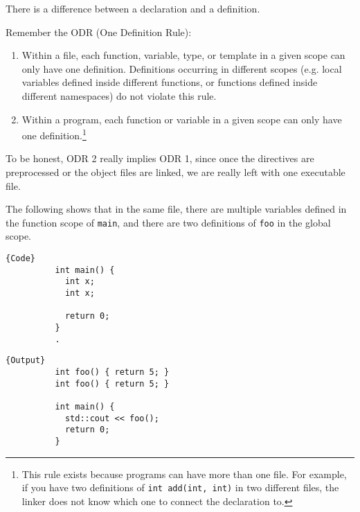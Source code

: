 \documentclass{article}
\begin{document}
    There is a difference between a declaration and a definition. 

    \begin{definition}[ODR]
      Remember the ODR (One Definition Rule): 
      \begin{enumerate}
        \item Within a file, each function, variable, type, or template in a given scope can only have one definition. Definitions occurring in different scopes (e.g. local variables defined inside different functions, or functions defined inside different namespaces) do not violate this rule. 

        \item Within a program, each function or variable in a given scope can only have one definition.\footnote{This rule exists because programs can have more than one file. For example, if you have two definitions of \texttt{int add(int, int)} in two different files, the linker does not know which one to connect the declaration to.}
      \end{enumerate}
      To be honest, ODR 2 really implies ODR 1, since once the directives are preprocessed or the object files are linked, we are really left with one executable file. 
    \end{definition} 

    \begin{example} 
      The following shows that in the same file, there are multiple variables defined in the function scope of \texttt{main}, and there are two definitions of \texttt{foo} in the global scope. 
      
      \noindent\begin{minipage}{.5\textwidth}
        \begin{lstlisting}[]{Code}
          int main() {
            int x; 
            int x;

            return 0;
          } 
          .
        \end{lstlisting}
        \end{minipage}
        \hfill
        \begin{minipage}{.49\textwidth}
        \begin{lstlisting}[]{Output}
          int foo() { return 5; }
          int foo() { return 5; }

          int main() {
            std::cout << foo();
            return 0;
          } 
        \end{lstlisting}
      \end{minipage}
    \end{example}
\end{document}

